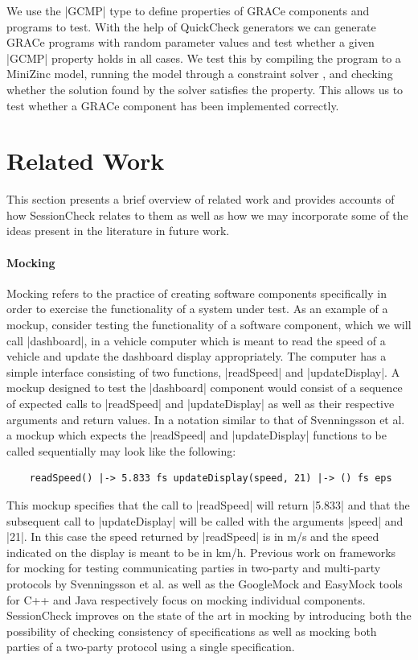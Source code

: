 \documentclass{article}
\begin{document}
We use the |GCMP| type to define properties of GRACe components and programs to
test.
%
With the help of QuickCheck generators we can generate GRACe programs with
random parameter values and test whether a given |GCMP| property holds in all
cases.
%
We test this by compiling the program to a MiniZinc model, running the model through
a constraint solver , and checking whether
the solution found by the solver satisfies the property.
%
This allows us to test whether a GRACe component has been implemented correctly.


\section{Related Work}

This section presents a brief overview of related work and provides accounts
of how SessionCheck relates to them as well as how we may incorporate some of
the ideas present in the literature in future work.

\paragraph{Mocking}

Mocking refers to the practice of creating software components specifically
in order to exercise the functionality of a system under test.
%
As an example of a mockup, consider testing the functionality of a software
component, which we will call |dashboard|, in a vehicle computer which is
meant to read the speed of a vehicle and update the dashboard display
appropriately.
%
The computer has a simple interface consisting of two functions,
|readSpeed| and |updateDisplay|.
%
A mockup designed to test the |dashboard| component would consist of a sequence
of expected calls to |readSpeed| and |updateDisplay| as well as their
respective arguments and return values.
%
In a notation similar to that of Svenningsson et al. \cite{HughesMocking}
a mockup which expects the |readSpeed| and |updateDisplay| functions to be
called sequentially may look like the following:
%
\begin{verbatim}
    readSpeed() |-> 5.833 fs updateDisplay(speed, 21) |-> () fs eps
\end{verbatim}
%
This mockup specifies that the call to |readSpeed| will return |5.833| and that
the subsequent call to |updateDisplay| will be called with the arguments
|speed| and |21|.
%
In this case the speed returned by |readSpeed| is in m/s and the speed indicated
on the display is meant to be in km/h.
%
Previous work on frameworks for mocking for testing communicating parties
in two-party and multi-party protocols by Svenningsson et al. \cite{HughesMocking}
as well as the GoogleMock \cite{GoogleMock} and EasyMock \cite{EasyMock} tools
for C++ and Java respectively focus on mocking individual components.
%
SessionCheck improves on the state of the art in mocking by introducing
both the possibility of checking consistency of specifications as well as
mocking both parties of a two-party protocol using a single specification.
%
\end{document}
